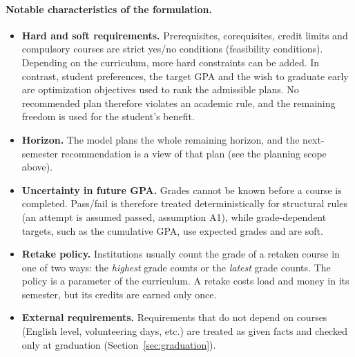 \documentclass[10pt,a4paper]{article}
\begin{document}
\paragraph{Notable characteristics of the formulation.}
\begin{itemize}
      \item \textbf{Hard and soft requirements.} Prerequisites, corequisites, credit limits and compulsory courses are strict yes/no conditions (feasibility conditions). Depending on the curriculum, more hard constraints can be added. In contrast, student preferences, the target GPA and the wish to graduate early are optimization objectives used to rank the admissible plans. No recommended plan therefore violates an academic rule, and the remaining freedom is used for the student's benefit.
      \item \textbf{Horizon.} The model plans the whole remaining horizon, and the next-semester recommendation is a view of that plan (see the planning scope above).
      \item \textbf{Uncertainty in future GPA.} Grades cannot be known before a course is completed. Pass/fail is therefore treated deterministically for structural rules (an attempt is assumed passed, assumption A1), while grade-dependent targets, such as the cumulative GPA, use expected grades and are soft.
      \item \textbf{Retake policy.} Institutions usually count the grade of a retaken course in one of two ways: the \emph{highest} grade counts or the \emph{latest} grade counts. The policy is a parameter of the curriculum. A retake costs load and money in its semester, but its credits are earned only once.
      \item \textbf{External requirements.} Requirements that do not depend on courses (English level, volunteering days, etc.) are treated as given facts and checked only at graduation (Section~\ref{sec:graduation}).
\end{itemize}

\end{document}
